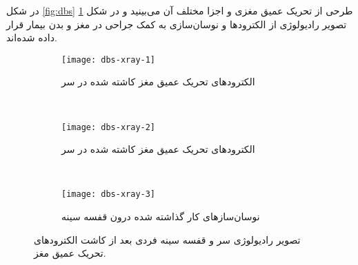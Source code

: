 در شکل 
\ref{fig:dbs}
طرحی از تحریک عمیق مغزی و اجزا مختلف آن می‌بینید و در شکل
\ref{fig:dbs-xray}
تصویر رادیولوژی از الکترودها و نوسان‌سازی به کمک جراحی در مغز و بدن بیمار قرار داده شده‌اند.

\begin{figure}[h!]
     \centering
     \begin{subfigure}[t]{0.3\textwidth}
         \centering
         \texttt{[image: dbs-xray-1]}
         \caption{الکترودهای تحریک عمیق مغز کاشته شده در سر }
     \end{subfigure}
     \
     \begin{subfigure}[t]{0.3\textwidth}
         \centering
         \texttt{[image: dbs-xray-2]}
         \caption{الکترودهای تحریک عمیق مغز کاشته شده در سر }
     \end{subfigure}
     \
     \begin{subfigure}[t]{0.3\textwidth}
         \centering
         \texttt{[image: dbs-xray-3]}
         \caption{    نوسان‌سازهای کار گذاشته شده درون قفسه سینه}
     \end{subfigure}
        \caption{
تصویر رادیولوژی سر و قفسه سینه فردی بعد از کاشت الکترودهای تحریک عمیق مغز.
         }
        \label{fig:dbs-xray}
\end{figure}
%




